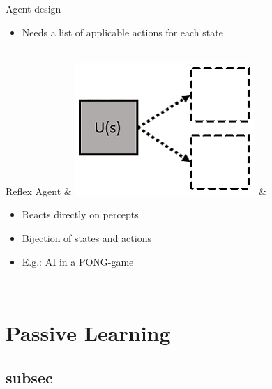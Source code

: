 \begin{frame}[c]{Agent design}
{\begin{table}[h]
\begin{tabu}
\begin{itemize}[leftmargin=*]
				\item Needs a list of applicable actions for each state
			\end{itemize} \\ \hline
			Reflex Agent & \includegraphics[width=\linewidth,keepaspectratio]{img-elias/reflex_agent.png} & \begin{itemize}[leftmargin=*]
				\item Reacts directly on percepts
				\item Bijection of states and actions
				\item E.g.: AI in a PONG-game
			\end{itemize} \\ %
		\end{tabu}
	\end{table}
}
\end{frame}

\section{Passive Learning}
\subsection{subsec} %

